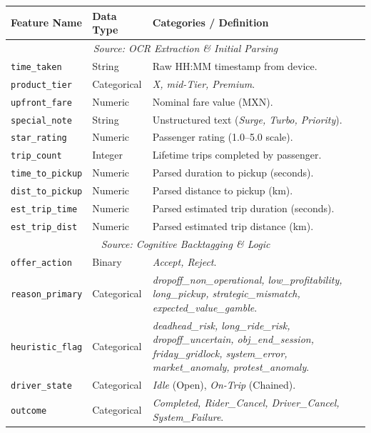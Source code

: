 \begin{table}[H]
    \centering
    \small
    \begin{tabularx}{\textwidth}{l l X}
        \toprule
        \textbf{Feature Name} & \textbf{Data Type} & \textbf{Categories / Definition} \\
        \midrule
        \multicolumn{3}{c}{\textit{Source: OCR Extraction \& Initial Parsing}} \\
        \midrule
        \texttt{time\_taken} & String & Raw HH:MM timestamp from device. \\
        \texttt{product\_tier} & Categorical & \textit{X, mid-Tier, Premium}. \\
        \texttt{upfront\_fare} & Numeric & Nominal fare value (MXN). \\
        \texttt{special\_note} & String & Unstructured text (\textit{Surge, Turbo, Priority}). \\
        \texttt{star\_rating} & Numeric & Passenger rating (1.0--5.0 scale). \\
        \texttt{trip\_count} & Integer & Lifetime trips completed by passenger. \\
        \texttt{time\_to\_pickup} & Numeric & Parsed duration to pickup (seconds). \\
        \texttt{dist\_to\_pickup} & Numeric & Parsed distance to pickup (km). \\
        \texttt{est\_trip\_time} & Numeric & Parsed estimated trip duration (seconds). \\
        \texttt{est\_trip\_dist} & Numeric & Parsed estimated trip distance (km). \\
        
        \midrule
        \multicolumn{3}{c}{\textit{Source: Cognitive Backtagging \& Logic}} \\
        \midrule
        \texttt{offer\_action} & Binary & \textit{Accept, Reject}. \\
        \texttt{reason\_primary} & Categorical & \textit{dropoff\_non\_operational, low\_profitability, long\_pickup, strategic\_mismatch, expected\_value\_gamble}. \\
        \texttt{heuristic\_flag} & Categorical & \textit{deadhead\_risk, long\_ride\_risk, dropoff\_uncertain, obj\_end\_session, friday\_gridlock, system\_error, market\_anomaly, protest\_anomaly}. \\
        \texttt{driver\_state} & Categorical & \textit{Idle} (Open), \textit{On-Trip} (Chained). \\
        \texttt{outcome} & Categorical & \textit{Completed, Rider\_Cancel, Driver\_Cancel, System\_Failure}. \\
        

\end{tabularx}
\end{table}
